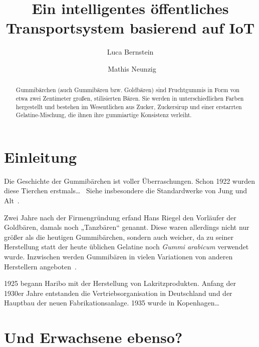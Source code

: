 \documentclass[ngerman]{seminarbeitrag}
\begin{document}
\title{Ein intelligentes öffentliches Transportsystem basierend auf IoT}
\author{Luca Bernstein\and\ Mathis Neunzig}

\maketitle%

\begin{abstract}
Gummibärchen (auch Gummibären bzw. Goldbären) sind Fruchtgummis in Form von etwa
zwei Zentimeter großen, stilisierten Bären. Sie werden in unterschiedlichen Farben hergestellt
und bestehen im Wesentlichen aus Zucker, Zuckersirup und einer erstarrten
Gelatine-Mischung, die ihnen ihre gummiartige Konsistenz verleiht.

\end{abstract}

\section{Einleitung}\label{einleitung}

Die Geschichte der Gummi\-bär\-chen ist voller                       %
Über\-raschun\-gen. Schon 1922 wurden diese Tierchen erstmals\ldots\ %
Siehe insbesondere die Standardwerke von Jung und Alt~\cite{ACM2019,Ivory2001}.

Zwei Jahre nach der Firmengründung erfand
Hans Riegel den Vorläufer der Goldbären, damals noch „Tanz\-bären“ genannt.
Diese waren allerdings nicht nur größer als die heutigen Gummibärchen,
sondern auch weicher, da zu seiner Herstellung statt der heute üblichen
Gelatine noch \emph{Gummi arabicum} verwendet wurde.
Inzwischen werden Gummibären in vielen Variationen von anderen Herstellern angeboten~\cite{gummi}.

1925 begann Haribo mit der Herstellung von Lakritz\-produkten.
Anfang der 1930er Jahre entstanden die Vertriebsorganisation in Deutschland
und der Hauptbau der neuen Fabrikationsanlage. 1935 wurde in Kopenhagen\ldots

\section{Und Erwachsene ebenso?}
\end{document}
